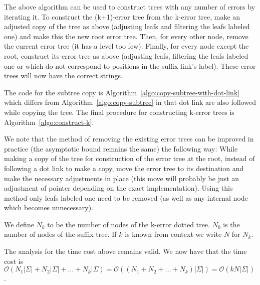 

The above algorithm can be used to construct trees with any number of errors by iterating it. To construct the (k+1)-error tree from the k-error tree, make an adjusted copy of the tree as above (adjusting leafs and filtering the leafs labeled one) and make this the new root error tree. Then, for every other node, remove the current error tree (it has a level too few). Finally, for every node except the root, construct its error tree as above (adjusting leafs, filtering the leafs labeled one or which do not correspond to positions in the suffix link's label). These error trees will now have the correct strings.



The code for the subtree copy is Algorithm~\ref{algo:copy-subtree-with-dot-link} which differs from Algorithm~\ref{algo:copy-subtree} in that dot link are also followed while copying the tree. The final procedure for constructing k-error trees is Algorithm~\ref{algo:construct-k}.

We note that the method of removing the existing error trees can be improved in practice (the asymptotic bound remains the same) the following way: While making a copy of the tree for construction of the error tree at the root, instead of following a dot link to make a copy, move the error tree to its destination and make the necessary adjustments in place (this move will probably be just an adjustment of pointer depending on the exact implementation). Using this method only leafs labeled one need to be removed (as well as any internal node which becomes unnecessary).

\begin{definition}
We define $N_k$ to be the number of nodes of the k-error dotted tree. $N_0$ is the number of nodes of the suffix tree. If $k$ is known from context we write $N$ for $N_k$.
\end{definition}

The analysis for the time cost above remains valid. We now have that the time cost is $\mathcal{O}(N_1|\Sigma|+N_2|\Sigma|+\dots+N_k|\Sigma)=\mathcal{O}((N_1+N_2+\dots+N_k)|\Sigma|)=\mathcal{O}(kN|\Sigma|)$.

